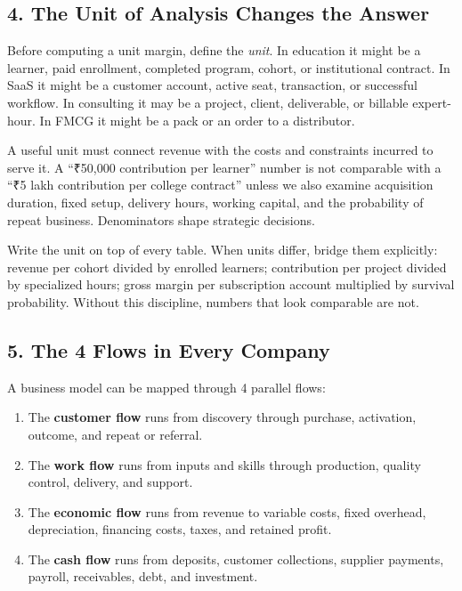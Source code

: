 \subsection*{4. The Unit of Analysis Changes the Answer}

Before computing a unit margin, define the \emph{unit}. In education it might be a learner, paid enrollment, completed program, cohort, or institutional contract. In SaaS it might be a customer account, active seat, transaction, or successful workflow. In consulting it may be a project, client, deliverable, or billable expert-hour. In FMCG it might be a pack or an order to a distributor.

A useful unit must connect revenue with the costs and constraints incurred to serve it. A ``₹50,000 contribution per learner'' number is not comparable with a ``₹5 lakh contribution per college contract'' unless we also examine acquisition duration, fixed setup, delivery hours, working capital, and the probability of repeat business. Denominators shape strategic decisions.

Write the unit on top of every table. When units differ, bridge them explicitly: revenue per cohort divided by enrolled learners; contribution per project divided by specialized hours; gross margin per subscription account multiplied by survival probability. Without this discipline, numbers that look comparable are not.

\subsection*{5. The 4 Flows in Every Company}

A business model can be mapped through 4 parallel flows:
\begin{enumerate}
  \item The \textbf{customer flow} runs from discovery through purchase, activation, outcome, and repeat or referral.
  \item The \textbf{work flow} runs from inputs and skills through production, quality control, delivery, and support.
  \item The \textbf{economic flow} runs from revenue to variable costs, fixed overhead, depreciation, financing costs, taxes, and retained profit.
  \item The \textbf{cash flow} runs from deposits, customer collections, supplier payments, payroll, receivables, debt, and investment.
\end{enumerate}

